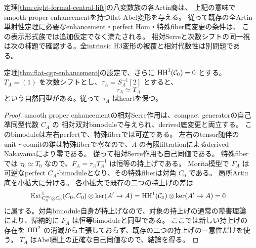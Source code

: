 \begin{corollary}\label{cor:formal-family-enhanced}
定理\ref{thm:eight-formal-central-lift}の八変数族の各Artin商は、
上記の意味でsmooth proper enhancementを持つflat Abel変形を与える。
従って既存の全Artin単射性定理に必要なenhancement・perfect Hom・特殊fiber底変更の条件は、
この表示形式族では追加仮定でなく満たされる。
相対Serreと次数シフトの同一視は次の補題で確認する。全intrinsic H3変形の被覆と相対代数性は別問題である。
\end{corollary}

\begin{lemma}[次数シフトと逆Serre作用の剛性]\label{lem:serre-shift-rigidity}
定理\ref{thm:flat-qgr-enhancement}の設定で、さらに $\operatorname{HH}^1(\mathcal C_0)=0$ とする。
$T_A=(1)$ を次数シフトとし、$\tau_A=S_A^{-1}[2]$ とすると、
\[
 \tau_A\simeq T_A
\]
という自然同型がある。従って $\tau_A$ はheartを保つ。
\end{lemma}
\begin{proof}
smooth proper enhancementの相対Serre作用は、compact generatorの自己準同型代数 $C_A$ の
相対双対bimoduleで与えられ、derived底変更と両立する。
このbimoduleは左右perfectで、特殊fiberでは可逆である。
左右のtensor随伴のunit・counitの錐は特殊fiberで零なので、$A$ の有限filtrationによるderived Nakayamaにより零である。
従って相対Serre作用も自己同値である。
特殊fiberでは $\tau_0\simeq T_0$ なので、$F_A=\tau_A T_A^{-1}$ は恒等の持上げである。
Morita模型で $F_A$ は可逆なperfect $C_A$-bimoduleとなり、その特殊fiberは対角 $C_0$ である。
局所Artin底を小拡大に分ける。
各小拡大で既存の二つの持上げの差は
\[
 \operatorname{Ext}^1_{C_0^{\rm op}\otimes C_0}(C_0,C_0)\otimes\ker(A'\to A)
 =\operatorname{HH}^1(\mathcal C_0)\otimes\ker(A'\to A)=0
\]
に属する。対角bimodule自身が持上げなので、対象の持上げの通常の障害理論
\cite{LowenObject}により、帰納的に $F_A$ は恒等bimoduleと同型である。
ここでは新しい持上げの存在を $\operatorname{HH}^2$ の消滅から主張しておらず、既存の二つの持上げの一意性だけを使う。
$T_A$ はAbel圏上の正確な自己同値なので、結論を得る。
\end{proof}

